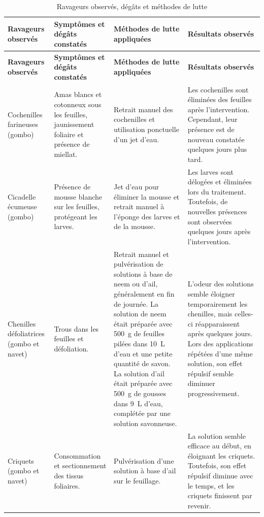 {\small
\begin{longtable}{|p{2.6cm}|p{3.4cm}|p{4.6cm}|p{4cm}|}
    \caption{Ravageurs observés, dégâts et méthodes de lutte}
    \label{tab:ravageurs_lutte} \\
    \hline
    \textbf{Ravageurs observés} & \textbf{Symptômes et dégâts constatés} & \textbf{Méthodes de lutte appliquées} & \textbf{Résultats observés} \\
    \hline
    \endfirsthead
    \hline
    \textbf{Ravageurs observés} & \textbf{Symptômes et dégâts constatés} & \textbf{Méthodes de lutte appliquées} & \textbf{Résultats observés} \\
    \hline
    \endhead
    Cochenilles farineuses (gombo) & Amas blancs et cotonneux sous les feuilles, jaunissement foliaire et présence de miellat. & Retrait manuel des cochenilles et utilisation ponctuelle d'un jet d'eau. & Les cochenilles sont éliminées des feuilles après l'intervention. Cependant, leur présence est de nouveau constatée quelques jours plus tard. \\
    \hline
    Cicadelle écumeuse (gombo) & Présence de mousse blanche sur les feuilles, protégeant les larves. & Jet d'eau pour éliminer la mousse et retrait manuel à l'éponge des larves et de la mousse. & Les larves sont délogées et éliminées lors du traitement. Toutefois, de nouvelles présences sont observées quelques jours après l'intervention. \\
    \hline
    Chenilles défoliatrices (gombo et navet) & Trous dans les feuilles et défoliation. & Retrait manuel et pulvérisation de solutions à base de neem ou d'ail, généralement en fin de journée. La solution de neem était préparée avec 500~g de feuilles pilées dans 10~L d'eau et une petite quantité de savon. La solution d'ail était préparée avec 500~g de gousses dans 9~L d'eau, complétée par une solution savonneuse. & L'odeur des solutions semble éloigner temporairement les chenilles, mais celles-ci réapparaissent après quelques jours. Lors des applications répétées d'une même solution, son effet répulsif semble diminuer progressivement. \\
    \hline
    Criquets (gombo et navet) & Consommation et sectionnement des tissus foliaires. & Pulvérisation d'une solution à base d'ail sur le feuillage. & La solution semble efficace au début, en éloignant les criquets. Toutefois, son effet répulsif diminue avec le temps, et les criquets finissent par revenir. \\
    \hline
\end{longtable}
}

